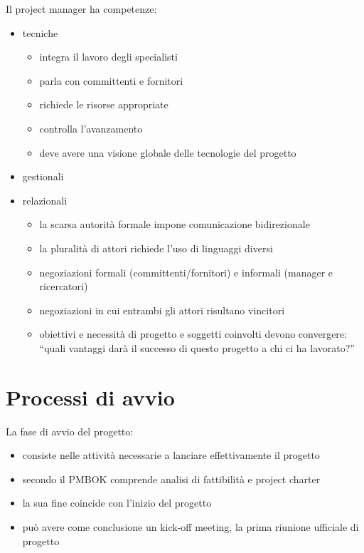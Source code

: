 \documentclass[answers, a4paper, 11pt]{exam}
\begin{document}
Il project manager ha competenze:
\begin{itemize}
    \item tecniche
    \begin{itemize}
        \item integra il lavoro degli specialisti
        \item parla con committenti e fornitori
        \item richiede le risorse appropriate
        \item controlla l'avanzamento
        \item deve avere una visione globale delle tecnologie del progetto
    \end{itemize}
    \item gestionali
    \item relazionali
    \begin{itemize}
        \item la scarsa autorità formale impone comunicazione bidirezionale
        \item la pluralità di attori richiede l'uso di linguaggi diversi
        \item negoziazioni formali (committenti/fornitori) e informali (manager e ricercatori)
        \item negoziazioni in cui entrambi gli attori risultano vincitori
        \item obiettivi e necessità di progetto e soggetti coinvolti devono convergere: ``quali vantaggi darà il successo di questo progetto a chi ci ha lavorato?''
    \end{itemize}
\end{itemize}

\section{Processi di avvio}

La fase di avvio del progetto:
\begin{itemize}
    \item consiste nelle attività necessarie a lanciare effettivamente il progetto
    \item secondo il PMBOK comprende analisi di fattibilità e project charter
    \item la sua fine coincide con l'inizio del progetto
    \item può avere come conclusione un kick-off meeting, la prima riunione ufficiale di progetto
\end{itemize}
\end{document}
